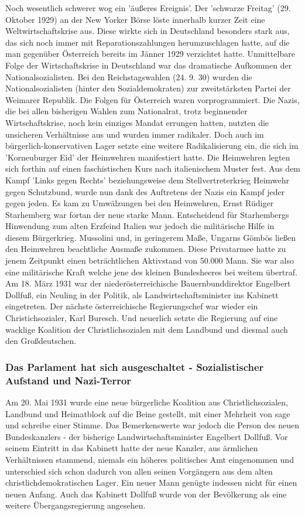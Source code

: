 \documentclass[letterpaper, 12pt]{article}
\let\tempsubsubsection\subsubsection
\renewcommand\subsubsection[1]{\vspace{0cm}\tempsubsubsection{#1}\vspace{0cm}}
\begin{document}
Noch wesentlich schwerer wog ein 'äußeres Ereignis'. Der 'schwarze Freitag' (29. Oktober 1929) an der New Yorker Börse löste innerhalb kurzer Zeit eine Weltwirtschaftskrise aus. Diese wirkte sich in Deutschland besonders stark aus, das sich noch immer mit Reparationszahlungen herumzuschlagen hatte, auf die man gegenüber Österreich bereits im Jänner 1929 verzichtet hatte. Unmittelbare Folge der Wirtschaftskrise in Deutschland war das dramatische Aufkommen der Nationalsozialisten. Bei den Reichstagswahlen (24. 9. 30) wurden die Nationalsozialisten (hinter den Sozialdemokraten) zur zweitstärksten Partei der Weimarer Republik. Die Folgen für Österreich waren vorprogrammiert. Die Nazis, die bei allen bisherigen Wahlen zum Nationalrat, trotz beginnender Wirtschaftskrise, noch kein einziges Mandat errungen hatten, nutzten die unsicheren Verhältnisse aus und wurden immer radikaler. Doch auch im bürgerlich-konservativen Lager setzte eine weitere Radikalisierung ein, die sich im 'Korneuburger Eid' der Heimwehren manifestiert hatte. Die Heimwehren legten sich forthin auf einen faschistischen Kurs nach italienischem Muster fest. Aus dem Kampf 'Links gegen Rechts' beziehungsweise dem Stellvertreterkrieg Heimwehr gegen Schutzbund, wurde nun dank des Auftretens der Nazis ein Kampf jeder gegen jeden. Es kam zu Umwälzungen bei den Heimwehren, Ernst Rüdiger Starhemberg war fortan der neue starke Mann. Entscheidend für Starhembergs Hinwendung zum alten Erzfeind Italien war jedoch die militärische Hilfe in diesem Bürgerkrieg. Mussolini und, in geringerem Maße, Ungarns Gömbös ließen den Heimwehren beachtliche Ausmaße zukommen. Diese Privatarmee hatte zu jenem Zeitpunkt einen beträchtlichen Aktivstand von 50.000 Mann. Sie war also eine militärische Kraft welche jene des kleinen Bundesheeres bei weitem übertraf. \\
Am 18. März 1931 war der niederösterreichische Bauernbunddirektor Engelbert Dollfuß, ein Neuling in der Politik, als Landwirtschaftsminister ins Kabinett eingetreten. Der nächste österreichische Regierungschef war wieder ein Christichsozialer, Karl Buresch. Und neuerlich setzte die Regierung auf eine wacklige Koalition der Christlichsozialen mit dem Landbund und diesmal auch den Großdeutschen.

\subsubsection{Das Parlament hat sich ausgeschaltet - Sozialistischer Aufstand und Nazi-Terror}

Am 20. Mai 1931 wurde eine neue bürgerliche Koalition aus Christlichsozialen, Landbund und Heimatblock auf die Beine gestellt, mit einer Mehrheit von sage und schreibe einer Stimme. Das Bemerkenswerte war jedoch die Person des neuen Bundeskanzlers - der bisherige Landwirtschaftsminister Engelbert Dollfuß. Vor seinem Eintritt in das Kabinett hatte der neue Kanzler, aus ärmlichen Verhältnissen stammend, niemals ein höheres politisches Amt eingenommen und unterschied sich schon dadurch von allen seinen Vorgängern aus dem alten christlichdemokratischen Lager. Ein neuer Mann genügte indessen nicht für einen neuen Anfang. Auch das Kabinett Dollfuß wurde von der Bevölkerung als eine weitere Übergangsregierung angesehen.

\clearpage


\end{document}
